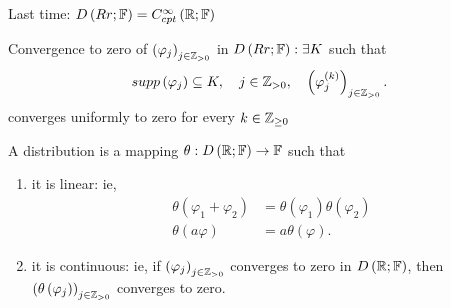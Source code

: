 
Last time: $D\left( Rr; \mathbb{F} \right) = C^{\infty}_{cpt}\left( \mathbb{R};\mathbb{F} \right) $ 

Convergence to zero of $\left( \varphi _{j} \right) _{j \in \mathbb{Z}_{>0}}$ in $D\left( Rr; \mathbb{F} \right): \exists K $ such that 
\[
	supp\left( \varphi_{j} \right) \subseteq K, \quad j \in  \mathbb{Z}_{>0}, \quad \left( \varphi_{j}^{\left( k \right) } \right) _{j \in \mathbb{Z}_{>0}}
.\] converges uniformly to zero for every $k \in  \mathbb{Z}_{\ge 0}$ 

\begin{definition}
	A distribution is a mapping $\theta : D\left( \mathbb{R}; \mathbb{F} \right)  \to \mathbb{F} $ such that 
	\begin{enumerate}
		\item it is linear: ie, 
			\begin{align*}
				\theta \left( \varphi_1 + \varphi_2 \right) &= \theta\left( \varphi_1 \right) \theta\left( \varphi_2 \right)  \\
				\theta\left( a\varphi \right) &= a \theta\left( \varphi \right) 
			.\end{align*}
		\item it is continuous: ie, if $\left( \varphi_{j} \right) _{j \in  \mathbb{Z}_{>0}}$ converges to zero in $D\left( \mathbb{R}; \mathbb{F} \right) $, then $\left( \theta\left( \varphi_{j} \right)  \right) _{j \in  \mathbb{Z}_{>0}}$ converges to zero. 
	\end{enumerate}
\end{definition}

